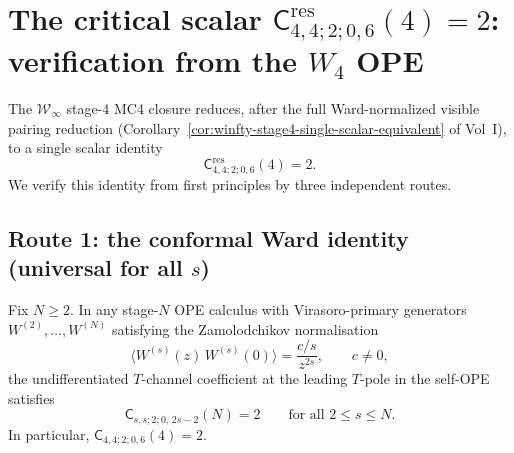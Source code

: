 \documentclass[11pt]{article}
\newcommand{\cW}{\mathcal{W}}
\begin{document}
%
%

\section{The critical scalar
\texorpdfstring{$\mathsf{C}^{\mathrm{res}}_{4,4;2;0,6}(4)=2$}{C\^res\_{4,4;2;0,6}(4)=2}:
verification from the $W_4$ OPE}
\label{sec:critical-scalar-verification}

The $\cW_\infty$ stage-$4$ MC4 closure reduces, after the full Ward-normalized
visible pairing reduction (Corollary~\ref*{cor:winfty-stage4-single-scalar-equivalent}
of Vol~I), to a single scalar identity
\[
\mathsf{C}^{\mathrm{res}}_{4,4;2;0,6}(4)=2.
\]
We verify this identity from first principles by three independent routes.

\subsection{Route 1: the conformal Ward identity (universal for all $s$)}

\begin{proposition}
\label{prop:universal-T-coefficient}
Fix $N\ge 2$.  In any stage-$N$ OPE calculus with Virasoro-primary
generators $W^{(2)},\dots,W^{(N)}$ satisfying the Zamolodchikov
normalisation
\[
\langle W^{(s)}(z)\,W^{(s)}(0)\rangle = \frac{c/s}{z^{2s}},
\qquad c\neq 0,
\]
the undifferentiated $T$-channel coefficient at the leading $T$-pole
in the self-OPE satisfies
\[
\mathsf{C}_{s,s;2;0,\,2s-2}(N)=2
\qquad\text{for all } 2\le s\le N.
\]
In particular, $\mathsf{C}_{4,4;2;0,6}(4)=2$.
\end{proposition}
\end{document}
